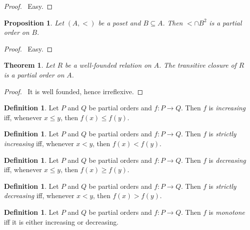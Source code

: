 \documentclass{report}
\let\qed\relax
\newtheorem{proposition}[axiom]{Proposition}
\newtheorem{theorem}[axiom]{Theorem}
\theoremstyle{definition}
\newtheorem{definition}[axiom]{Definition}
\begin{document}
    \begin{proof}
        \pf\ Easy. \qed
    \end{proof}

    \begin{proposition}
        Let $(A, <)$ be a poset and $B \subseteq A$. Then $< \cap B^2$ is a partial order on $B$.
    \end{proposition}

    \begin{proof}
        \pf\ Easy. \qed
    \end{proof}

    \begin{theorem}
        Let $R$ be a well-founded relation on $A$. The transitive closure of $R$ is a partial order on $A$.
    \end{theorem}

    \begin{proof}
        \pf\ It is well founded, hence irreflexive. \qed
    \end{proof}

    \begin{definition}
        Let $P$ and $Q$ be partial orders and $f : P \rightarrow Q$. Then $f$ is \emph{increasing}
        iff, whenever $x \leq y$, then $f(x) \leq f(y)$.
    \end{definition}

    \begin{definition}
        Let $P$ and $Q$ be partial orders and $f : P \rightarrow Q$. Then $f$ is \emph{strictly increasing}
        iff, whenever $x < y$, then $f(x) < f(y)$.
    \end{definition}

    \begin{definition}
        Let $P$ and $Q$ be partial orders and $f : P \rightarrow Q$. Then $f$ is \emph{decreasing}
        iff, whenever $x \leq y$, then $f(x) \geq f(y)$.
    \end{definition}
    
    \begin{definition}
        Let $P$ and $Q$ be partial orders and $f : P \rightarrow Q$. Then $f$ is \emph{strictly decreasing}
        iff, whenever $x < y$, then $f(x) > f(y)$.
    \end{definition}

    \begin{definition}
        Let $P$ and $Q$ be partial orders and $f : P \rightarrow Q$. Then $f$ is \emph{monotone}
        iff it is either increasing or decreasing.
    \end{definition}
\end{document}
